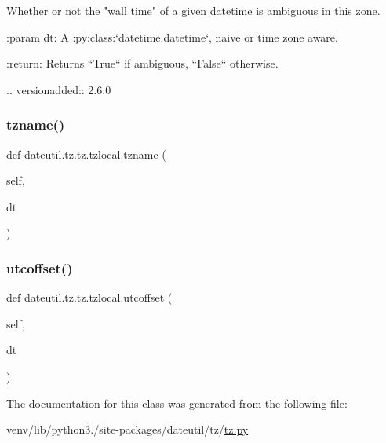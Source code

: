 \begin{DoxyVerb}Whether or not the "wall time" of a given datetime is ambiguous in this
zone.

:param dt:
    A :py:class:`datetime.datetime`, naive or time zone aware.


:return:
    Returns ``True`` if ambiguous, ``False`` otherwise.

.. versionadded:: 2.6.0
\end{DoxyVerb}
 \mbox{\label{classdateutil_1_1tz_1_1tz_1_1tzlocal_a62b0c533e3cafa39dfbce5f1d8ef7a6a}} 
\subsubsection{\texorpdfstring{tzname()}{tzname()}}
{\footnotesize\ttfamily def dateutil.\+tz.\+tz.\+tzlocal.\+tzname (\begin{DoxyParamCaption}\item[{}]{self,  }\item[{}]{dt }\end{DoxyParamCaption})}

\mbox{\label{classdateutil_1_1tz_1_1tz_1_1tzlocal_ad1f908257b3f40c687a25bc6aba24579}} 
\subsubsection{\texorpdfstring{utcoffset()}{utcoffset()}}
{\footnotesize\ttfamily def dateutil.\+tz.\+tz.\+tzlocal.\+utcoffset (\begin{DoxyParamCaption}\item[{}]{self,  }\item[{}]{dt }\end{DoxyParamCaption})}



The documentation for this class was generated from the following file\+:\begin{DoxyCompactItemize}
\item 
venv/lib/python3./site-\/packages/dateutil/tz/\hyperlink{tz_8py}{tz.\+py}\end{DoxyCompactItemize}

